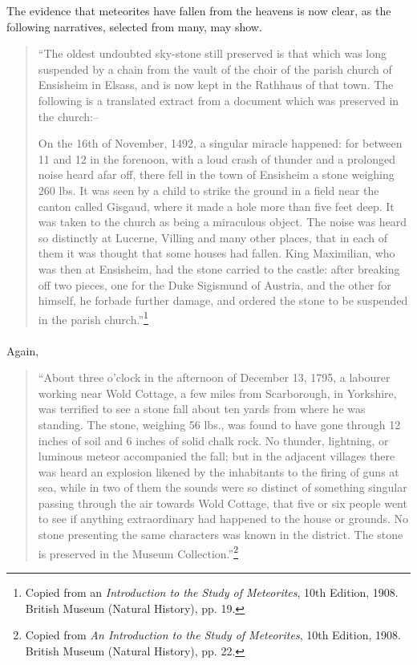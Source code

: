 \documentclass[a4paper, 12pt, oneside]{article}
\begin{document}
The evidence that meteorites have fallen from the heavens is now clear, as the following narratives, selected from many, may show.
\begin{quotation}
``The oldest undoubted sky-stone still preserved is that which was long suspended by a chain from the vault of the choir of the parish church of Ensisheim in Elsass, and is now kept in the Rathhaus of that town. The following is a translated extract from a document which was preserved in the church:--
\begin{displayquote}
On the 16th of November, 1492, a singular miracle happened: for between 11 and 12 in the forenoon, with a loud crash of thunder and a prolonged noise heard afar off, there fell in the town of Ensisheim a stone weighing 260 lbs. It was seen by a child to strike the ground in a field near the canton called Gisgaud, where it made a hole more than five feet deep. It was taken to the church as being a miraculous object. The noise was heard so distinctly at Lucerne, Villing and many other places, that in each of them it was thought that some houses had fallen. King Maximilian, who was then at Ensisheim, had the stone carried to the castle: after breaking off two pieces, one for the Duke Sigismund of Austria, and the other for himself, he forbade further damage, and ordered the stone to be suspended in the parish church.''\footnote{Copied from an \emph{Introduction to the Study of Meteorites}, 10th Edition, 1908. British Museum (Natural History), pp. 19.}
\end{displayquote}
\end{quotation}
\paragraph{}
Again,
\begin{quotation}
``About three o'clock in the afternoon of December 13, 1795, a labourer working near Wold Cottage, a few miles from Scarborough, in Yorkshire, was terrified to see a stone fall about ten yards from where he was standing. The stone, weighing 56 lbs., was found to have gone through 12 inches of soil and 6 inches of solid chalk rock. No thunder, lightning, or luminous meteor accompanied the fall; but in the adjacent villages there was heard an explosion likened by the inhabitants to the firing of guns at sea, while in two of them the sounds were so distinct of something singular passing through the air towards Wold Cottage, that five or six people went to see if anything extraordinary had happened to the house or grounds. No stone presenting the same characters was known in the district. The stone is preserved in the Museum Collection.''\footnote{Copied from \emph{An Introduction to the Study of Meteorites}, 10th Edition, 1908. British Museum (Natural History), pp. 22.}
\end{quotation}
\end{document}
